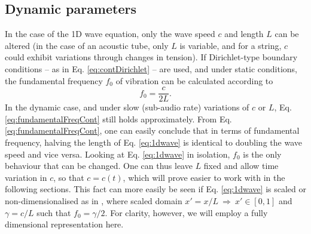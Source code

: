 \subsection{Dynamic parameters}\label{sec:dynamicParamsCont}
In the case of the 1D wave equation, only the wave speed $c$ and length $L$ can be altered (in the case of an acoustic tube, only $L$ is variable, and for a string, $c$ could exhibit variations through changes in tension). If Dirichlet-type boundary conditions -- as in Eq. \eqref{eq:contDirichlet} -- are used, and under static conditions, the fundamental frequency $f_0$ of vibration can be calculated according to
\begin{equation}\label{eq:fundamentalFreqCont}
    f_0 = \frac{c}{2L}.
\end{equation}
In the dynamic case, and under slow (sub-audio rate) variations of $c$ or $L$, Eq. \eqref{eq:fundamentalFreqCont} still holds approximately.
%
From Eq. \eqref{eq:fundamentalFreqCont}, one can easily conclude that in terms of fundamental frequency, halving the length of Eq. \eqref{eq:1dwave} is identical to doubling the wave speed and vice versa. Looking at Eq. \eqref{eq:1dwave} in isolation, $f_0$ is the only behaviour that can be changed. One can thus leave $L$ fixed %
and allow time variation in $c$, so that $c = c(t)$, which will prove easier to work with in the following sections. This fact can more easily be seen if Eq. \eqref{eq:1dwave} is scaled or non-dimensionalised as in \cite{bilbao2009}, where scaled domain  $x' = x/L\  \Rightarrow \ x'\in[0, 1]$ and $\gamma = c/L$ such that $f_0 = \gamma / 2$. For clarity, however, we will employ a fully dimensional representation here.
